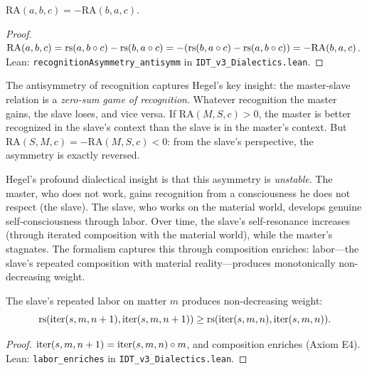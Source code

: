 \begin{theorem}
\label{thm:recognition-antisymm}
$\mathrm{RA}(a, b, c) = -\mathrm{RA}(b, a, c)$.
\end{theorem}

\begin{proof}
$\mathrm{RA}(a, b, c) = \mathrm{rs}(a, b \circ c) - \mathrm{rs}(b, a \circ c)
= -(\mathrm{rs}(b, a \circ c) - \mathrm{rs}(a, b \circ c)) = -\mathrm{RA}(b, a, c)$.
Lean: \texttt{recognitionAsymmetry\_antisymm} in
\texttt{IDT\_v3\_Dialectics.lean}.
\end{proof}

\begin{interpretation}
\label{interp:master-slave}
The antisymmetry of recognition captures Hegel's key insight: the master-slave
relation is a \emph{zero-sum game of recognition}. Whatever recognition the
master gains, the slave loses, and vice versa. If $\mathrm{RA}(M, S, c) > 0$,
the master is better recognized in the slave's context than the slave is in the
master's context. But $\mathrm{RA}(S, M, c) = -\mathrm{RA}(M, S, c) < 0$: from
the slave's perspective, the asymmetry is exactly reversed.

Hegel's profound dialectical insight is that this asymmetry is \emph{unstable}.
The master, who does not work, gains recognition from a consciousness he does
not respect (the slave). The slave, who works on the material world, develops
genuine self-consciousness through labor. Over time, the slave's
self-resonance increases (through iterated composition with the material
world), while the master's stagnates. The formalism captures this through
composition enriches: labor---the slave's repeated composition with material
reality---produces monotonically non-decreasing weight.
\end{interpretation}

\begin{theorem}
\label{thm:labor-enriches}
The slave's repeated labor on matter $m$ produces non-decreasing weight:
\[
\mathrm{rs}(\mathrm{iter}(s, m, n+1), \mathrm{iter}(s, m, n+1)) \geq
\mathrm{rs}(\mathrm{iter}(s, m, n), \mathrm{iter}(s, m, n)).
\]
\end{theorem}

\begin{proof}
$\mathrm{iter}(s, m, n+1) = \mathrm{iter}(s, m, n) \circ m$, and
composition enriches (Axiom E4).
Lean: \texttt{labor\_enriches} in \texttt{IDT\_v3\_Dialectics.lean}.
\end{proof}

